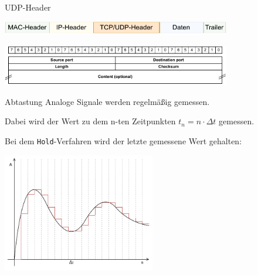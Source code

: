 \begin{defi}{UDP-Header}
    \begin{center}
        \includegraphics[width=0.75\textwidth]{includes/figures/defi_tcp_header_kapselung.pdf}

        \includegraphics[width=0.75\textwidth]{includes/figures/defi_udp_header.pdf}
    \end{center}
\end{defi}

\begin{bonus}{Abtastung}
    Analoge Signale werden regelmäßig gemessen.

    Dabei wird der Wert zu dem n-ten Zeitpunkten $t_n = n \cdot \Delta t$ gemessen.

    Bei dem \texttt{Hold}-Verfahren wird der letzte gemessene Wert gehalten:

    \begin{center}
        \includegraphics[width=0.5\textwidth]{includes/figures/defi_abtastrate.pdf}
    \end{center}
\end{bonus}

